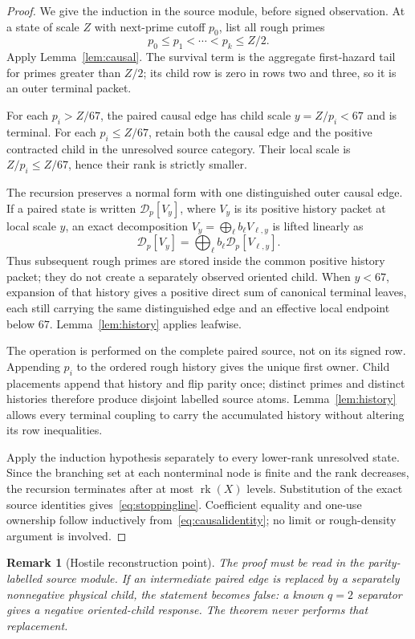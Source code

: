 \documentclass[11pt]{article}
\newtheorem{remark}[theorem]{Remark}
\newcommand{\rk}{\operatorname{rk}}
\begin{document}
\begin{proof}
We give the induction in the source module, before signed observation.  At a state of scale $Z$ with next-prime cutoff $p_0$, list all rough primes
\[
 p_0\le p_1<\cdots<p_k\le Z/2.
\]
Apply Lemma~\ref{lem:causal}.  The survival term is the aggregate first-hazard tail for primes greater than $Z/2$; its child row is zero in rows two and three, so it is an outer terminal packet.

For each $p_i>Z/67$, the paired causal edge has child scale $y=Z/p_i<67$ and is terminal.  For each $p_i\le Z/67$, retain both the causal edge and the positive contracted child in the unresolved source category.  Their local scale is $Z/p_i\le Z/67$, hence their rank is strictly smaller.

The recursion preserves a normal form with one distinguished outer causal edge.  If a paired state is written $\mathscr D_p[V_y]$, where $V_y$ is its positive history packet at local scale $y$, an exact decomposition $V_y=\bigoplus_\ell b_\ell V_{\ell,y}$ is lifted linearly as
\[
 \mathscr D_p[V_y]=\bigoplus_\ell b_\ell\mathscr D_p[V_{\ell,y}].
\]
Thus subsequent rough primes are stored inside the common positive history packet; they do not create a separately observed oriented child.  When $y<67$, expansion of that history gives a positive direct sum of canonical terminal leaves, each still carrying the same distinguished edge and an effective local endpoint below $67$.  Lemma~\ref{lem:history} applies leafwise.

The operation is performed on the complete paired source, not on its signed row.  Appending $p_i$ to the ordered rough history gives the unique first owner.  Child placements append that history and flip parity once; distinct primes and distinct histories therefore produce disjoint labelled source atoms.  Lemma~\ref{lem:history} allows every terminal coupling to carry the accumulated history without altering its row inequalities.

Apply the induction hypothesis separately to every lower-rank unresolved state.  Since the branching set at each nonterminal node is finite and the rank decreases, the recursion terminates after at most $\rk(X)$ levels.  Substitution of the exact source identities gives~\eqref{eq:stoppingline}.  Coefficient equality and one-use ownership follow inductively from~\eqref{eq:causalidentity}; no limit or rough-density argument is involved.
\end{proof}

\begin{remark}[Hostile reconstruction point]
The proof must be read in the parity-labelled source module.  If an intermediate paired edge is replaced by a separately nonnegative physical child, the statement becomes false: a known $q=2$ separator gives a negative oriented-child response.  The theorem never performs that replacement.
\end{remark}
\end{document}
